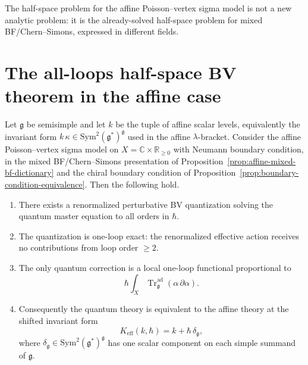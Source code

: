 \begin{remark}
The half-space problem for the affine Poisson--vertex sigma model is not a new analytic problem:
it is the already-solved half-space problem for mixed BF/Chern--Simons, expressed in different fields.
\end{remark}

\section{The all-loops half-space BV theorem in the affine case}

\begin{maintheorem}\label{thm:affine-half-space-bv}
Let $\mathfrak g$ be semisimple and let $k$ be the tuple of affine scalar levels, equivalently the invariant
form $k\,\kappa\in\mathrm{Sym}^2(\mathfrak g^*)^{\mathfrak g}$ used in the affine $\lambda$-bracket.
Consider the affine Poisson--vertex sigma model on
$X=\mathbb C\times\mathbb R_{\ge 0}$ with Neumann boundary condition, in the mixed BF/Chern--Simons
presentation of Proposition~\ref{prop:affine-mixed-bf-dictionary} and the chiral boundary condition of
Proposition~\ref{prop:boundary-condition-equivalence}.
Then the following hold.
\begin{enumerate}
 \item There exists a renormalized perturbative BV quantization solving the quantum master equation to all orders in $\hbar$.
 \item The quantization is one-loop exact: the renormalized effective action receives no contributions from loop order $\ge 2$.
 \item The only quantum correction is a local one-loop functional proportional to
 \begin{equation}
 \label{eq:one-loop-boundary-shift-functional}
 \hbar\int_X \operatorname{Tr}^{\mathrm{ad}}_{\mathfrak g}(\alpha\,\partial\alpha).
 \end{equation}
 \item Consequently the quantum theory is equivalent to the affine theory at the shifted invariant form
 \begin{equation}
 \label{eq:keff-def}
 K_{\mathrm{eff}}(k,\hbar) = k + \hbar\,\delta_{\mathfrak g},
 \end{equation}
 where $\delta_{\mathfrak g}\in\mathrm{Sym}^2(\mathfrak g^*)^{\mathfrak g}$ has one scalar component on each
 simple summand of $\mathfrak g$.
\end{enumerate}
\end{maintheorem}


